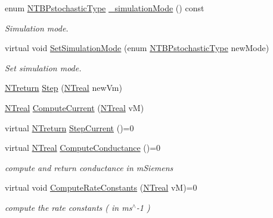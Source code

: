 \begin{DoxyCompactItemize}
enum \hyperlink{ntbp__object__obj_8h_a9983412df2da7c7ecc65cd066e73b345}{NTBPstochasticType} \hyperlink{class_n_t_b_p__membrane__current__o_ac1b4d62d65f9b20eef7a7decd7d131c1}{\_\-simulationMode} () const 
\begin{DoxyCompactList}\small\item\em Simulation mode. \item\end{DoxyCompactList}\item 
virtual void \hyperlink{class_n_t_b_p__membrane__current__o_aca09614976c9a8d525048fe39e054b5f}{SetSimulationMode} (enum \hyperlink{ntbp__object__obj_8h_a9983412df2da7c7ecc65cd066e73b345}{NTBPstochasticType} newMode)
\begin{DoxyCompactList}\small\item\em Set simulation mode. \item\end{DoxyCompactList}\item 
\hyperlink{nt__types_8h_ab9564ee8f091e809d21b8451c6683c53}{NTreturn} \hyperlink{class_n_t_b_p__membrane__current__o_adcf828e1de2d4e28c42388baa40a965c}{Step} (\hyperlink{nt__types_8h_a814a97893e9deb1eedcc7604529ba80d}{NTreal} newVm)
\item 
\hyperlink{nt__types_8h_a814a97893e9deb1eedcc7604529ba80d}{NTreal} \hyperlink{class_n_t_b_p__membrane__current__o_a51e2c5201a55183e62a053c466daf926}{ComputeCurrent} (\hyperlink{nt__types_8h_a814a97893e9deb1eedcc7604529ba80d}{NTreal} vM)
\item 
virtual \hyperlink{nt__types_8h_ab9564ee8f091e809d21b8451c6683c53}{NTreturn} \hyperlink{class_n_t_b_p__membrane__current__o_a423b482d830c9c70098502114477c057}{StepCurrent} ()=0
\item 
virtual \hyperlink{nt__types_8h_a814a97893e9deb1eedcc7604529ba80d}{NTreal} \hyperlink{class_n_t_b_p__membrane__current__o_a7462cc87d283cb6663aac47a29b06a96}{ComputeConductance} ()=0
\begin{DoxyCompactList}\small\item\em compute and return conductance in mSiemens \item\end{DoxyCompactList}\item 
virtual void \hyperlink{class_n_t_b_p__membrane__current__o_ab77d9401846785c6c11cc0640a6b5c87}{ComputeRateConstants} (\hyperlink{nt__types_8h_a814a97893e9deb1eedcc7604529ba80d}{NTreal} vM)=0
\begin{DoxyCompactList}\small\item\em compute the rate constants ( in ms$^\wedge$-\/1 ) \item\end{DoxyCompactList}\item 

\end{DoxyCompactItemize}
